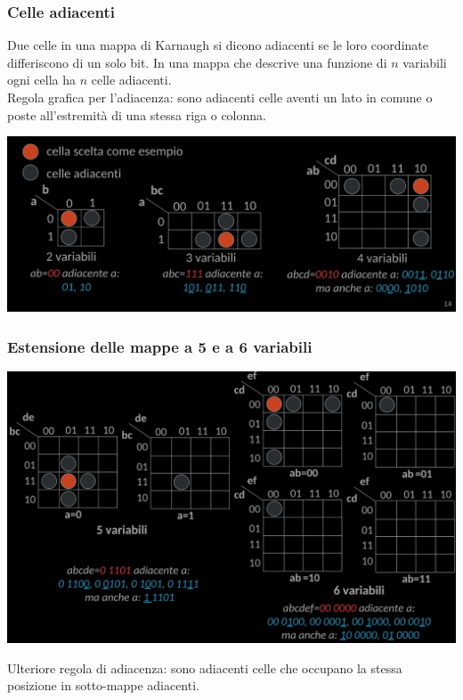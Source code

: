 \documentclass{article}
\begin{document}
\subsubsection{Celle adiacenti}
Due celle in una mappa di Karnaugh si dicono adiacenti se le loro coordinate differiscono di un solo bit. In una mappa che descrive una funzione di $n$ variabili ogni cella ha $n$ celle adiacenti.
\vspace{0.2cm}\\
Regola grafica per l'adiacenza: sono adiacenti celle aventi un lato in comune o poste all'estremità di una stessa riga o colonna.
\begin{center}
\includegraphics[scale=0.53]{cellead.png}
\end{center}
\subsubsection*{Estensione delle mappe a 5 e a 6 variabili}
\begin{center}
    \includegraphics[scale=0.53]{celle5-6.png}
\end{center}
Ulteriore regola di adiacenza: sono adiacenti celle che occupano la stessa posizione in sotto-mappe adiacenti.
\end{document}
